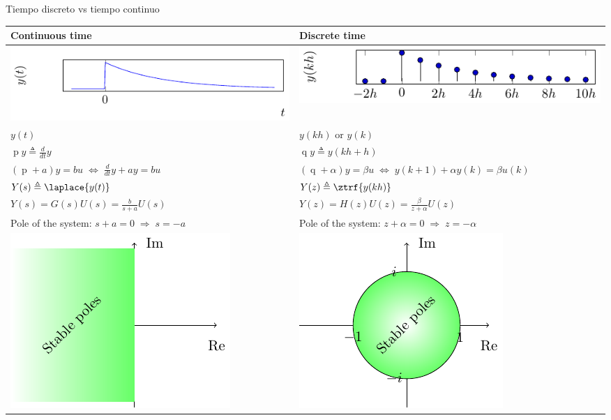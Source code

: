 \documentclass[presentation,aspectratio=169]{beamer}
\begin{document}
\begin{frame}[label={sec:orgbf9701c}]{Tiempo discreto vs tiempo continuo}
\begin{center}
\begin{tabular}{ll}
Continuous time & Discrete time\\
\hline
\includegraphics[width=0.4\linewidth]{../../figures/cont-fcn} & \includegraphics[width=0.4\linewidth]{../../figures/discrete-fcn}\\
\(y(t)\) & \(y(kh)\) or \(y(k)\)\\
\(\operatorname{p} y \triangleq \frac{d}{dt} y\) & \(\operatorname{q}y \triangleq y(kh+h)\)\\
\((\operatorname{p}+a) y = bu \;\Leftrightarrow\; \frac{d}{dt}y + ay = bu\) & \((\operatorname{q} + \alpha) y = \beta u \; \Leftrightarrow \; y(k+1) + \alpha y(k) = \beta u(k)\)\\
\(Y(s) \triangleq \laplace{y(t)}\) & \(Y(z) \triangleq \ztrf{y(kh)}\)\\
\(Y(s) = G(s)U(s) = \frac{b}{s+a}U(s)\) & \(Y(z) = H(z)U(z) = \frac{\beta}{z+\alpha}U(z)\)\\
Pole of the system: \(s+a=0 \; \Rightarrow \; s = -a\) & Pole of the system: \(z+\alpha = 0 \; \Rightarrow \; z = -\alpha\)\\
\includegraphics[width=0.22\linewidth]{../../figures/cont-stable} & \includegraphics[width=0.22\linewidth]{../../figures/discrete-stable}\\
\hline
\end{tabular}
\end{center}
\end{frame}
\end{document}
